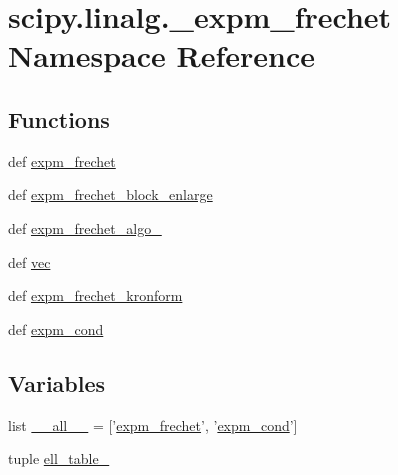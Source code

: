 \hypertarget{namespacescipy_1_1linalg_1_1__expm__frechet}{}\section{scipy.\+linalg.\+\_\+expm\+\_\+frechet Namespace Reference}
\label{namespacescipy_1_1linalg_1_1__expm__frechet}
\subsection*{Functions}
\begin{DoxyCompactItemize}
\item 
def \hyperlink{namespacescipy_1_1linalg_1_1__expm__frechet_ab633291fdace0b29c882d7fa0d3a11f9}{expm\+\_\+frechet}
\item 
def \hyperlink{namespacescipy_1_1linalg_1_1__expm__frechet_ad2cef451f8d886852528c817f6821988}{expm\+\_\+frechet\+\_\+block\+\_\+enlarge}
\item 
def \hyperlink{namespacescipy_1_1linalg_1_1__expm__frechet_ad55eaf8fe8d5bc6873d6d14b2bd15894}{expm\+\_\+frechet\+\_\+algo\+\_}
\item 
def \hyperlink{namespacescipy_1_1linalg_1_1__expm__frechet_a7cead70458b4523e3976d4bfaeb551cd}{vec}
\item 
def \hyperlink{namespacescipy_1_1linalg_1_1__expm__frechet_ad4270262678edf4c1adbe19bc012dd44}{expm\+\_\+frechet\+\_\+kronform}
\item 
def \hyperlink{namespacescipy_1_1linalg_1_1__expm__frechet_a8f1234b0cca9c06537a31c9617466d35}{expm\+\_\+cond}
\end{DoxyCompactItemize}
\subsection*{Variables}
\begin{DoxyCompactItemize}
\item 
list \hyperlink{namespacescipy_1_1linalg_1_1__expm__frechet_ad3291740dbebb68237cef47cb64523d4}{\+\_\+\+\_\+all\+\_\+\+\_\+} = \mbox{[}'\hyperlink{namespacescipy_1_1linalg_1_1__expm__frechet_ab633291fdace0b29c882d7fa0d3a11f9}{expm\+\_\+frechet}', '\hyperlink{namespacescipy_1_1linalg_1_1__expm__frechet_a8f1234b0cca9c06537a31c9617466d35}{expm\+\_\+cond}'\mbox{]}
\item 
tuple \hyperlink{namespacescipy_1_1linalg_1_1__expm__frechet_abd59cd447a91a9c851001c0d511783b9}{ell\+\_\+table\+\_}
\end{DoxyCompactItemize}


